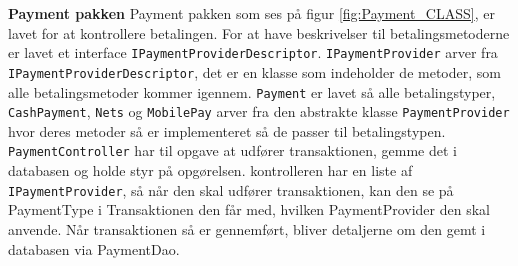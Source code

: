 \textbf{Payment pakken}
\newline
Payment pakken som ses på figur \ref{fig:Payment_CLASS}, er lavet for at kontrollere betalingen. For at have beskrivelser til betalingsmetoderne  er lavet et interface \texttt{IPaymentProviderDescriptor}. \texttt{IPaymentProvider} arver fra \texttt{IPaymentProviderDescriptor}, det er en klasse som indeholder de metoder, som alle betalingsmetoder kommer igennem. \texttt{Payment} er lavet så alle betalingstyper, \texttt{CashPayment}, \texttt{Nets} og \texttt{MobilePay} arver fra den abstrakte klasse \texttt{PaymentProvider} hvor deres metoder så er implementeret så de passer til betalingstypen. 
\newline
\newline
\texttt{PaymentController} har til opgave at udfører transaktionen, gemme det i databasen og holde styr på opgørelsen. kontrolleren har en liste af \texttt{IPaymentProvider}, så når den skal udfører transaktionen, kan den se på PaymentType i Transaktionen den får med, hvilken PaymentProvider den skal anvende. Når transaktionen så er gennemført, bliver detaljerne om den gemt i databasen via PaymentDao. 